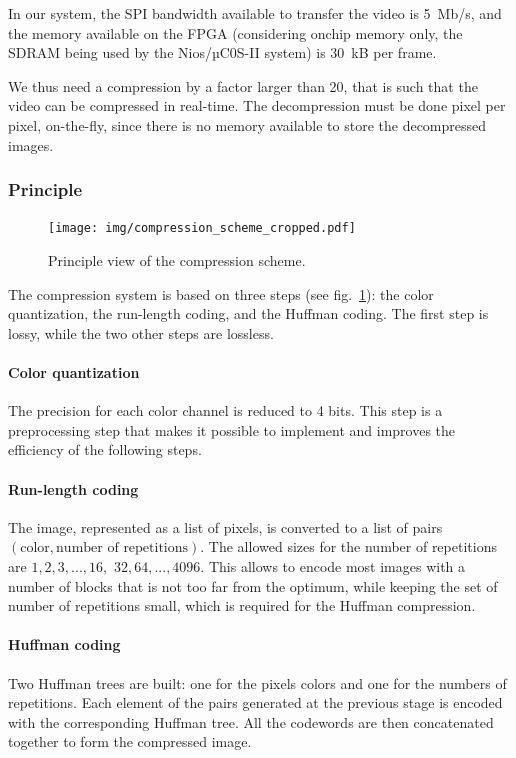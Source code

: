 \documentclass[english, DIV=13]{scrartcl}
\begin{document}
In our system, the SPI bandwidth available to transfer the video is \SI{5}{Mb/s},
and the memory available on the FPGA (considering onchip memory only, the SDRAM
being used by the Nios/µC0S-II system) is \SI{30}{kB} per frame.

We thus need a compression by a factor larger than 20, that is such that
the video can be compressed in real-time. The decompression must be done
pixel per pixel, on-the-fly, since there is no memory available to store the
decompressed images.

\subsubsection{Principle}

\begin{figure}
    \centering
    \texttt{[image: img/compression\_scheme\_cropped.pdf]}
    \caption{Principle view of the compression scheme.}
    \label{fig:compression}
\end{figure}

The compression system is based on three steps (see fig.~\ref{fig:compression}):
the color quantization, the run-length coding, and the Huffman coding. The first
step is lossy, while the two other steps are lossless.

\paragraph{Color quantization} The precision for each color channel is
reduced to 4 bits. This step is a preprocessing step that makes it possible
to implement and improves the efficiency of the following steps.

\paragraph{Run-length coding} The image, represented as a list of pixels,
is converted to a list of pairs $(\text{color}, \text{number of repetitions})$.
The allowed sizes for the number of repetitions are
$1, 2, 3, ..., 16,$ $32, 64, ..., 4096$. This allows to encode most images with
a number of blocks that is not too far from the optimum, while keeping the set
of number of repetitions small, which is required for the Huffman compression.

\paragraph{Huffman coding} Two Huffman trees are built: one for the pixels colors
and one for the numbers of repetitions. Each element of the pairs generated
at the previous stage is encoded with the corresponding Huffman tree.
All the codewords are then concatenated together to form the compressed image.
\end{document}
